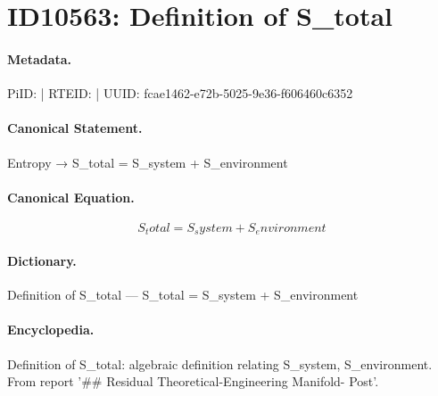 \section*{ID10563: Definition of S\_total}
\paragraph{Metadata.}
PiID:  | RTEID:  | UUID: fcae1462-e72b-5025-9e36-f606460c6352

\paragraph{Canonical Statement.}
Entropy → S\_total = S\_system + S\_environment

\paragraph{Canonical Equation.}
\[
S_total = S_system + S_environment
\]

\paragraph{Dictionary.}
Definition of S\_total — S\_total = S\_system + S\_environment

\paragraph{Encyclopedia.}
Definition of S\_total: algebraic definition relating S\_system, S\_environment. From report '\#\# Residual Theoretical-Engineering Manifold- Post'.
